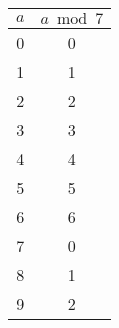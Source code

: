 \begin{minipage}{0.32\textwidth}
    \centering
    \begin{tabular}{c|c}
        \rowcolor{OliveGreen!10}$a$ & $a \bmod 7$ \\
        \hline
        0                           & 0           \\
        1                           & 1           \\
        2                           & 2           \\
        3                           & 3           \\
        4                           & 4           \\
        5                           & 5           \\
        6                           & 6           \\
        7                           & 0           \\
        8                           & 1           \\
        9                           & 2           \\
    \end{tabular}
\end{minipage}

